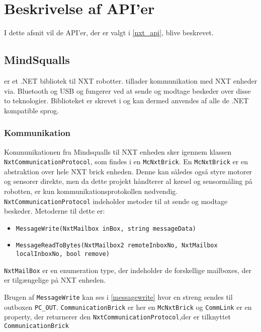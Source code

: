 
\section{Beskrivelse af API'er}

I dette afsnit vil de API'er, der er valgt i \cref{nxt_api}, blive beskrevet.

\subsection{MindSqualls}\label{mindsqualls}
\mindsqualls er et .NET bibliotek til \legos NXT robotter.
\mindsqualls tillader kommunikation med NXT enheder via. Bluetooth og USB og fungerer ved at sende og modtage beskeder over disse to teknologier.
Biblioteket er skrevet i \csharp og kan dermed anvendes af alle de .NET kompatible sprog.

\subsubsection{Kommunikation}
Kommunikationen fra Mindsqualls til NXT enheden sker igennem klassen \lstinline[style=csharp]!NxtCommunicationProtocol!, som findes i en \lstinline[style=csharp]!McNxtBrick!. 
En \lstinline[style=csharp]!McNxtBrick! er en abstraktion over hele NXT brick enheden. 
Denne kan således også styre motorer og sensorer direkte, men da dette projekt håndterer al kørsel og sensormåling på robotten, er kun kommunikationsprotokollen nødvendig.
\lstinline[style=csharp]!NxtCommunicationProtocol! indeholder metoder til at sende og modtage beskeder.
Metoderne til dette er:

\begin{itemize}
\item \lstinline[style=csharp]!MessageWrite(NxtMailbox inBox, string messageData)!
\item \lstinline[style=csharp]!MessageReadToBytes(NxtMailbox2 remoteInboxNo, NxtMailbox localInboxNo, bool remove)!
\end{itemize}

\lstinline[style=csharp]!NxtMailBox! er en enumeration type, der indeholder de forskellige mailboxes, der er tilgængelige på NXT enheden.

Brugen af \lstinline[style=csharp]!MessageWrite! kan ses i \cref{messagewrite} hvor en streng sendes til outboxen \lstinline[style=csharp]!PC_OUT!.
\lstinline[style=csharp]!CommunicationBrick! er her en \lstinline[style=csharp]!McNxtBrick! og \lstinline[style=csharp]!CommLink! er en property, der returnerer den \lstinline[style=csharp]!NxtCommunicationProtocol!,der er tilknyttet \lstinline[style=csharp]!CommunicationBrick!

